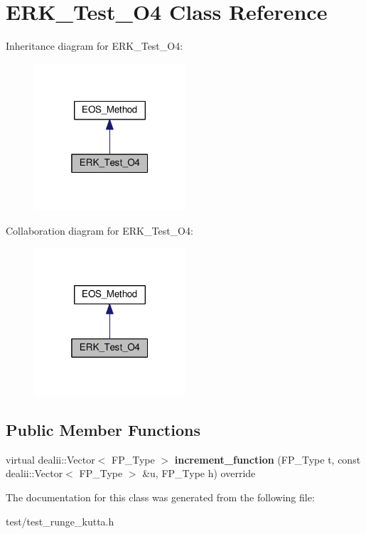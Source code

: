 \hypertarget{classERK__Test__O4}{}\section{E\+R\+K\+\_\+\+Test\+\_\+\+O4 Class Reference}
\label{classERK__Test__O4}


Inheritance diagram for E\+R\+K\+\_\+\+Test\+\_\+\+O4\+:\nopagebreak
\begin{figure}[H]
\begin{center}
\leavevmode
\includegraphics[width=160pt]{classERK__Test__O4__inherit__graph}
\end{center}
\end{figure}


Collaboration diagram for E\+R\+K\+\_\+\+Test\+\_\+\+O4\+:\nopagebreak
\begin{figure}[H]
\begin{center}
\leavevmode
\includegraphics[width=160pt]{classERK__Test__O4__coll__graph}
\end{center}
\end{figure}
\subsection*{Public Member Functions}
\begin{DoxyCompactItemize}
\item 
\mbox{\label{classERK__Test__O4_aecbde91dc15a38d8a56e878fbdb0f624}} 
virtual dealii\+::\+Vector$<$ F\+P\+\_\+\+Type $>$ {\bfseries increment\+\_\+function} (F\+P\+\_\+\+Type t, const dealii\+::\+Vector$<$ F\+P\+\_\+\+Type $>$ \&u, F\+P\+\_\+\+Type h) override
\end{DoxyCompactItemize}


The documentation for this class was generated from the following file\+:\begin{DoxyCompactItemize}
\item 
test/test\+\_\+runge\+\_\+kutta.\+h\end{DoxyCompactItemize}
